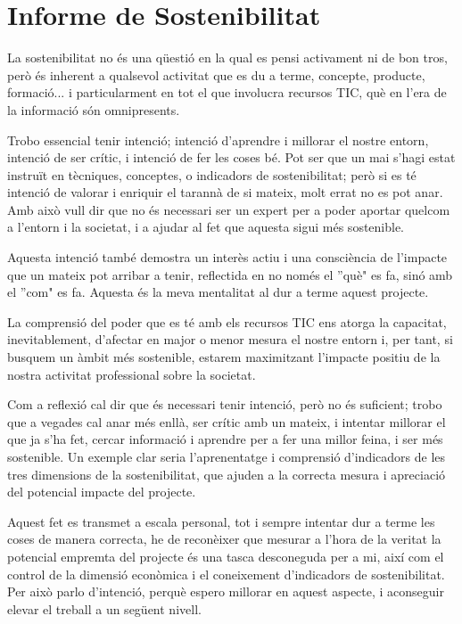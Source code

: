 \documentclass[a4paper]{report}
\begin{document}
	\section{Informe de Sostenibilitat}
	La sostenibilitat no és una qüestió en la qual es pensi activament ni de bon tros, però és inherent a qualsevol activitat que es du a terme, concepte, producte, formació... i particularment en tot el que involucra recursos TIC, què en l'era de la informació són omnipresents. \par
	Trobo essencial tenir intenció; intenció d'aprendre i millorar el nostre entorn, intenció de ser crític, i intenció de fer les coses bé. Pot ser que un mai s'hagi estat instruït en tècniques, conceptes, o indicadors de sostenibilitat; però si es té intenció de valorar i enriquir el tarannà de si mateix, molt errat no es pot anar. Amb això vull dir que no és necessari ser un expert per a poder aportar quelcom a l'entorn i la societat, i a ajudar al fet que aquesta sigui més sostenible. \par
	Aquesta intenció també demostra un interès actiu i una consciència de l'impacte que un mateix pot arribar a tenir, reflectida en no només el ''què" es fa, sinó amb el ''com" es fa. Aquesta és la meva mentalitat al dur a terme aquest projecte. \par
	La comprensió del poder que es té amb els recursos TIC ens atorga la capacitat, inevitablement, d'afectar en major o menor mesura el nostre entorn i, per tant, si busquem un àmbit més sostenible, estarem maximitzant l'impacte positiu de la nostra activitat professional sobre la societat. \par
	Com a reflexió cal dir que és necessari tenir intenció, però no és suficient; trobo que a vegades cal anar més enllà, ser crític amb un mateix, i intentar millorar el que ja s'ha fet, cercar informació i aprendre per a fer una millor feina, i ser més sostenible. Un exemple clar seria l'aprenentatge i comprensió d'indicadors de les tres dimensions de la sostenibilitat, que ajuden a la correcta mesura i apreciació del potencial impacte del projecte. \par
	Aquest fet es transmet a escala personal, tot i sempre intentar dur a terme les coses de manera correcta, he de reconèixer que mesurar a l'hora de la veritat la potencial empremta del projecte és una tasca desconeguda per a mi, així com el control de la dimensió econòmica i el coneixement d'indicadors de sostenibilitat. Per això parlo d'intenció, perquè espero millorar en aquest aspecte, i aconseguir elevar el treball a un següent nivell.
	
\end{document}
